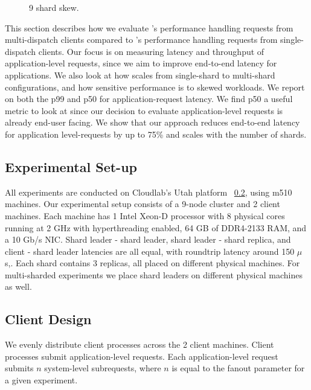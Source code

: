 \begin{figure}[!htb]
{  \label{fig:9shardsskewlast}
}
\caption{9 shard skew.}
\end{figure}


This section describes how we evaluate \system's performance handling requests from multi-dispatch clients compared to \mpaxos's performance handling requests from single-dispatch clients. 
Our focus is on measuring latency and throughput of application-level requests, since we aim to improve end-to-end latency for applications.
We also look at how \system scales from single-shard to multi-shard configurations, and how sensitive performance is to skewed workloads. We report on both the p99 and p50 for application-request latency. 
We find p50 a useful metric to look at since our decision to evaluate application-level requests is already end-user facing.
We show that our approach reduces end-to-end latency for application level-requests by up to 75\% and scales with the number of shards. 

\subsection{Experimental Set-up}
All experiments are conducted on Cloudlab's Utah platform ~\ref{}, using m510 machines. 
Our experimental setup consists of a 9-node cluster and 2 client machines. 
Each machine has 1 Intel Xeon-D processor with 8 physical cores running at 2 GHz with hyperthreading enabled, 64 GB of DDR4-2133 RAM, and a 10 Gb/s NIC. 
Shard leader - shard leader, shard leader - shard replica, and client - shard leader latencies are all equal, with roundtrip latency around 150 $\mu$s,. 
Each shard contains 3 replicas, all placed on different physical machines. For multi-sharded experiments we place shard leaders on different physical machines as well. 



\subsection{Client Design}
We evenly distribute client processes across the 2 client machines. Client processes submit application-level requests. Each application-level request submits $n$ system-level subrequests, where $n$ is equal to the fanout parameter for a given experiment. 

